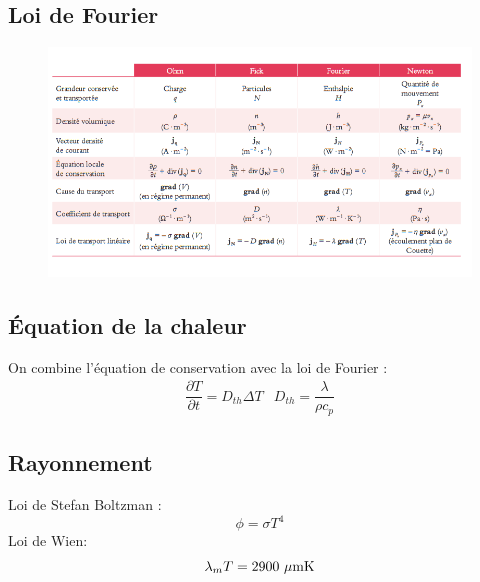 \documentclass[10pt]{beamer}
\begin{document}
\subsection{Loi de Fourier}
\begin{frame}{\insertsubsection}
    \begin{figure}
        \centering
        \includegraphics[width=1\textwidth]{TableauPhenomenesTransportsBUP.png}
    \end{figure}
\end{frame}
\subsection{Équation de la chaleur}

\begin{frame}{\insertsubsection}
    On combine l'équation de conservation avec la loi de Fourier :
    \begin{equation}
        \begin{array}{cc}
        \dfrac{\partial T}{\partial t}=D_{th}\Delta T & D_{th}=\dfrac{\lambda}{\rho c_p}
    \end{array}
    \end{equation}
\end{frame}
\subsection{Rayonnement}

\begin{frame}{\insertsubsection}
    Loi de Stefan Boltzman : 
    \begin{equation}
        \phi = \sigma T^4
    \end{equation}
    Loi de Wien:
    \begin{equation}
        \lambda_mT = 2900 \rm ~\mu mK
    \end{equation}
\end{frame}
\end{document}

